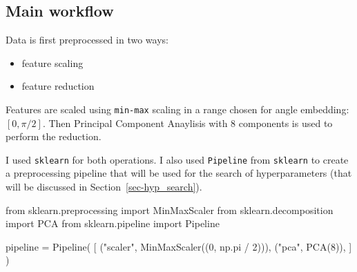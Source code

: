 \documentclass[
  13pt,
  a4paper,
  DIV=11,
  numbers=noendperiod,
  oneside]{scrreprt}
\newenvironment{Shaded}{\begin{snugshade}}{\end{snugshade}}
\newcommand{\DecValTok}[1]{\textcolor[rgb]{0.68,0.00,0.00}{#1}}
\newcommand{\ImportTok}[1]{\textcolor[rgb]{0.00,0.46,0.62}{#1}}
\newcommand{\NormalTok}[1]{\textcolor[rgb]{0.00,0.23,0.31}{#1}}
\newcommand{\OperatorTok}[1]{\textcolor[rgb]{0.37,0.37,0.37}{#1}}
\newcommand{\StringTok}[1]{\textcolor[rgb]{0.13,0.47,0.30}{#1}}
\providecommand{\tightlist}{%
  \setlength{\itemsep}{0pt}\setlength{\parskip}{0pt}}\usepackage{longtable,booktabs,array}
\begin{document}
\subsection{Main workflow}\label{main-workflow}

Data is first preprocessed in two ways:

\begin{itemize}
\tightlist
\item
  feature scaling\\
\item
  feature reduction
\end{itemize}

Features are scaled using \texttt{min-max} scaling in a range chosen for
angle embedding: \([0, \pi/2]\). Then Principal Component Anaylisis with
8 components is used to perform the reduction.

I used \texttt{sklearn} for both operations. I also used
\texttt{Pipeline} from \texttt{sklearn} to create a preprocessing
pipeline that will be used for the search of hyperparameters (that will
be discussed in Section~\ref{sec-hyp_search}).

\begin{Shaded}
\begin{Highlighting}[numbers=left,,]
\ImportTok{from}\NormalTok{ sklearn.preprocessing }\ImportTok{import}\NormalTok{ MinMaxScaler}
\ImportTok{from}\NormalTok{ sklearn.decomposition }\ImportTok{import}\NormalTok{ PCA}
\ImportTok{from}\NormalTok{ sklearn.pipeline }\ImportTok{import}\NormalTok{ Pipeline}

\NormalTok{pipeline }\OperatorTok{=}\NormalTok{ Pipeline(}
\NormalTok{    [}
\NormalTok{        (}\StringTok{"scaler"}\NormalTok{, MinMaxScaler((}\DecValTok{0}\NormalTok{, np.pi }\OperatorTok{/} \DecValTok{2}\NormalTok{))),}
\NormalTok{        (}\StringTok{"pca"}\NormalTok{, PCA(}\DecValTok{8}\NormalTok{)),}
\NormalTok{    ]}
\NormalTok{)}
\end{Highlighting}
\end{Shaded}
\end{document}
